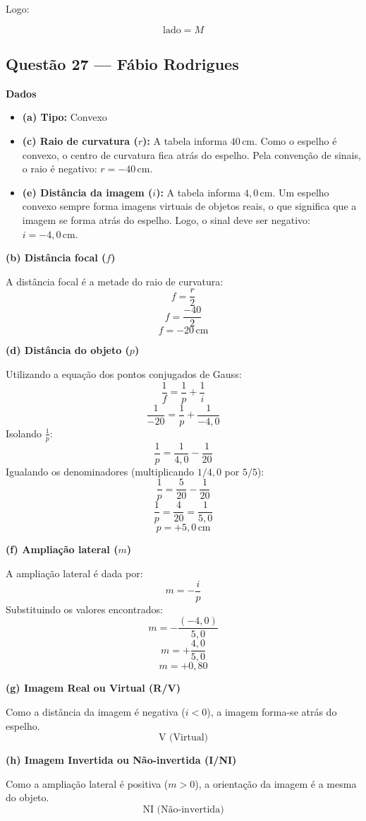 \documentclass[12pt,a4paper]{article}
\begin{document}
Logo:

\[
\text{lado}=M
\]

\subsection{Questão 27 — Fábio Rodrigues}
\textbf{Dados}
\begin{itemize}
    \item \textbf{(a) Tipo:} Convexo
    \item \textbf{(c) Raio de curvatura (\(r\)):} A tabela informa \(40\,\text{cm}\). Como o espelho é convexo, o centro de curvatura fica atrás do espelho. Pela convenção de sinais, o raio é negativo: \(r = -40\,\text{cm}\).
    \item \textbf{(e) Distância da imagem (\(i\)):} A tabela informa \(4,0\,\text{cm}\). Um espelho convexo sempre forma imagens virtuais de objetos reais, o que significa que a imagem se forma atrás do espelho. Logo, o sinal deve ser negativo: \(i = -4,0\,\text{cm}\).
\end{itemize}

\textbf{(b) Distância focal (\(f\))}

A distância focal é a metade do raio de curvatura:
\[
f = \frac{r}{2}
\]
\[
f = \frac{-40}{2}
\]
\[
\boxed{f = -20\,\text{cm}}
\]

\textbf{(d) Distância do objeto (\(p\))}

Utilizando a equação dos pontos conjugados de Gauss:
\[
\frac{1}{f} = \frac{1}{p} + \frac{1}{i}
\]
\[
\frac{1}{-20} = \frac{1}{p} + \frac{1}{-4,0}
\]
Isolando \(\frac{1}{p}\):
\[
\frac{1}{p} = \frac{1}{4,0} - \frac{1}{20}
\]
Igualando os denominadores (multiplicando \(1/4,0\) por \(5/5\)):
\[
\frac{1}{p} = \frac{5}{20} - \frac{1}{20}
\]
\[
\frac{1}{p} = \frac{4}{20} = \frac{1}{5,0}
\]
\[
\boxed{p = +5,0\,\text{cm}}
\]

\textbf{(f) Ampliação lateral (\(m\))}

A ampliação lateral é dada por:
\[
m = -\frac{i}{p}
\]
Substituindo os valores encontrados:
\[
m = -\frac{(-4,0)}{5,0}
\]
\[
m = +\frac{4,0}{5,0}
\]
\[
\boxed{m = +0,80}
\]

\textbf{(g) Imagem Real ou Virtual (R/V)}

Como a distância da imagem é negativa (\(i < 0\)), a imagem forma-se atrás do espelho.
\[
\boxed{\text{V (Virtual)}}
\]

\textbf{(h) Imagem Invertida ou Não-invertida (I/NI)}

Como a ampliação lateral é positiva (\(m > 0\)), a orientação da imagem é a mesma do objeto.
\[
\boxed{\text{NI (Não-invertida)}}
\]
\end{document}
